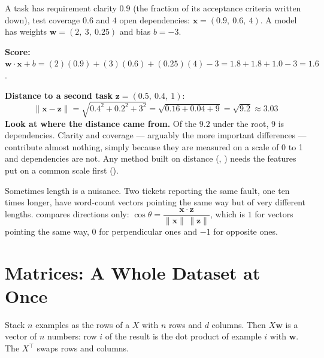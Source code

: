\begin{worked}
A task has requirement clarity $0.9$ (the fraction of its acceptance criteria
written down), test coverage $0.6$ and $4$ open dependencies:
$\mathbf{x} = (0.9,\ 0.6,\ 4)$. A model has weights $\mathbf{w} = (2,\ 3,\ 0.25)$
and bias $b = -3$.

\smallskip
\textbf{Score:} $\mathbf{w}\cdot\mathbf{x} + b = (2)(0.9) + (3)(0.6) + (0.25)(4) - 3
= 1.8 + 1.8 + 1.0 - 3 = \mathbf{1.6}$.

\smallskip
\textbf{Distance to a second task} $\mathbf{z} = (0.5,\ 0.4,\ 1)$:
\[
\|\mathbf{x}-\mathbf{z}\| = \sqrt{0.4^2 + 0.2^2 + 3^2} = \sqrt{0.16 + 0.04 + 9}
= \sqrt{9.2} \approx \mathbf{3.03}
\]
\textbf{Look at where the distance came from.} Of the $9.2$ under the root, $9$
is dependencies. Clarity and coverage --- arguably the more important differences
--- contribute almost nothing, simply because they are measured on a scale of 0
to 1 and dependencies are not. Any method built on distance (,
) needs the features put on a common scale first
().
\end{worked}

\begin{conceptbox}
Sometimes length is a nuisance. Two tickets reporting the same fault, one ten
times longer, have word-count vectors pointing the same way but of very different
lengths.  compares directions only:
$\cos\theta = \dfrac{\mathbf{x}\cdot\mathbf{z}}{\|\mathbf{x}\|\,\|\mathbf{z}\|}$,
which is $1$ for vectors pointing the same way, $0$ for perpendicular ones and
$-1$ for opposite ones.
\end{conceptbox}

\section{Matrices: A Whole Dataset at Once}

\begin{definitionbox}
Stack $n$ examples as the rows of a  $X$ with $n$ rows and $d$
columns. Then $X\mathbf{w}$ is a vector of $n$ numbers: row $i$ of the result is
the dot product of example $i$ with $\mathbf{w}$. The 
$X^{\top}$ swaps rows and columns.
\end{definitionbox}

